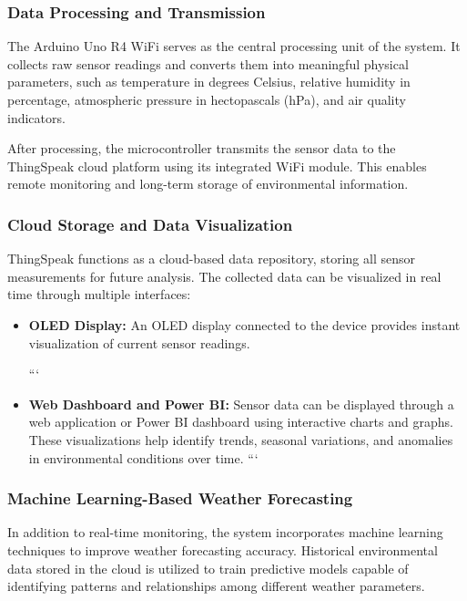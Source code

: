\documentclass[conference]{IEEEtran}
\begin{document}
\subsubsection{Data Processing and Transmission}

The Arduino Uno R4 WiFi serves as the central processing unit of the system. It collects raw sensor readings and converts them into meaningful physical parameters, such as temperature in degrees Celsius, relative humidity in percentage, atmospheric pressure in hectopascals (hPa), and air quality indicators.

After processing, the microcontroller transmits the sensor data to the ThingSpeak cloud platform using its integrated WiFi module. This enables remote monitoring and long-term storage of environmental information.

\subsubsection{Cloud Storage and Data Visualization}

ThingSpeak functions as a cloud-based data repository, storing all sensor measurements for future analysis. The collected data can be visualized in real time through multiple interfaces:

\begin{itemize}
\item \textbf{OLED Display:} An OLED display connected to the device provides instant visualization of current sensor readings.

```
\item \textbf{Web Dashboard and Power BI:} Sensor data can be displayed through a web application or Power BI dashboard using interactive charts and graphs. These visualizations help identify trends, seasonal variations, and anomalies in environmental conditions over time.
```

\end{itemize}

\subsubsection{Machine Learning-Based Weather Forecasting}

In addition to real-time monitoring, the system incorporates machine learning techniques to improve weather forecasting accuracy. Historical environmental data stored in the cloud is utilized to train predictive models capable of identifying patterns and relationships among different weather parameters.
\end{document}
